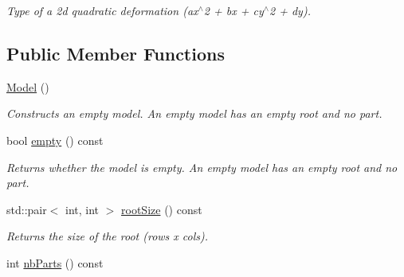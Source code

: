 \begin{DoxyCompactItemize}
\begin{DoxyCompactList}\small\item\em Type of a 2d quadratic deformation ({\ttfamily ax$^\wedge$2 + bx + cy$^\wedge$2 + dy}). \end{DoxyCompactList}\end{DoxyCompactItemize}
\subsection*{Public Member Functions}
\begin{DoxyCompactItemize}
\item 
\hypertarget{class_f_f_l_d_1_1_model_ae3b375de5f6df4faf74a95d64748e048}{\hyperlink{class_f_f_l_d_1_1_model_ae3b375de5f6df4faf74a95d64748e048}{Model} ()}\label{class_f_f_l_d_1_1_model_ae3b375de5f6df4faf74a95d64748e048}

\begin{DoxyCompactList}\small\item\em Constructs an empty model. An empty model has an empty root and no part. \end{DoxyCompactList}\item 
\hypertarget{class_f_f_l_d_1_1_model_a10abfb84338378da2152bae25d0ab0c2}{bool \hyperlink{class_f_f_l_d_1_1_model_a10abfb84338378da2152bae25d0ab0c2}{empty} () const }\label{class_f_f_l_d_1_1_model_a10abfb84338378da2152bae25d0ab0c2}

\begin{DoxyCompactList}\small\item\em Returns whether the model is empty. An empty model has an empty root and no part. \end{DoxyCompactList}\item 
\hypertarget{class_f_f_l_d_1_1_model_a35ed01e517a3beb1c6acb98b3b33db53}{std\-::pair$<$ int, int $>$ \hyperlink{class_f_f_l_d_1_1_model_a35ed01e517a3beb1c6acb98b3b33db53}{root\-Size} () const }\label{class_f_f_l_d_1_1_model_a35ed01e517a3beb1c6acb98b3b33db53}

\begin{DoxyCompactList}\small\item\em Returns the size of the root ({\ttfamily rows x cols}). \end{DoxyCompactList}\item 
\hypertarget{class_f_f_l_d_1_1_model_a9a64087a29e741402a35c730cf36a52e}{int \hyperlink{class_f_f_l_d_1_1_model_a9a64087a29e741402a35c730cf36a52e}{nb\-Parts} () const }\label{class_f_f_l_d_1_1_model_a9a64087a29e741402a35c730cf36a52e}


\end{DoxyCompactItemize}
